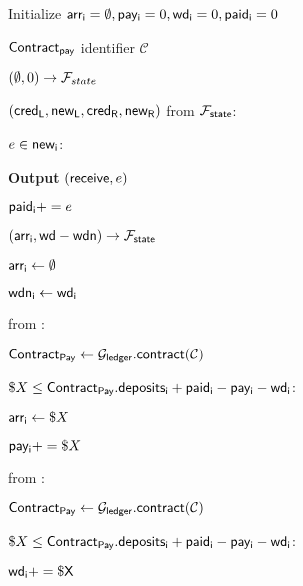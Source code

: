 \begin{bbox}[title=$\Pi_{pay}$]

Initialize ${\mathsf {arr_i}} = \emptyset, {\mathsf {pay_i}} = 0, {\mathsf {wd_i}} = 0, {\mathsf {paid_i}} = 0$

${\mathsf {Contract_{pay}}}$ identifier $\mathcal{C}$ 

\Send $(\emptyset, 0) \rightarrow \mathcal{F}_{state}$

\OnInput $({\mathsf {cred_L}}, {\mathsf {new_L}}, {\mathsf {cred_R}}, {\mathsf {new_R}})$ from $\mathcal{F}_{{\mathsf {state}}}$:

	\quad \For $e \in {\mathsf {new_i}}$:

		\qquad \textbf{Output} $({\mathsf {receive}}, e)$

		\qquad ${\mathsf {paid_i}} += e$
	
	\quad \Send $({\mathsf {arr_i}}, {\mathsf {wd}}-{\mathsf {wdn}}) \rightarrow \mathcal{F}_{{\mathsf {state}}}$

	\quad ${\mathsf {arr_i}} \leftarrow \emptyset$

	\quad ${\mathsf {wdn_i}} \leftarrow {\mathsf {wd_i}}$

\OnInput {} from \Env:

	\quad ${\mathsf {Contract_{Pay}}} \leftarrow \mathcal{G}_{{\mathsf {ledger}}}.{\mathsf {contract}}(\mathcal{C})$

	\quad \If $\$X \leq {\mathsf {Contract_{Pay}}}.{\mathsf {deposits_i}} + {\mathsf {paid_i}} - {\mathsf {pay_i}} - {\mathsf {wd_i}}$:

		\qquad ${\mathsf {arr_i}} \leftarrow \$X$

		\qquad ${\mathsf {pay_i}} += \$X$

\OnInput {} from \Env:

	\quad ${\mathsf {Contract_{Pay}}} \leftarrow \mathcal{G}_{{\mathsf {ledger}}}.{\mathsf {contract}}(\mathcal{C})$

	\quad \If $\$X \leq {\mathsf {Contract_{Pay}}}.{\mathsf {deposits_i}} + {\mathsf {paid_i}} - {\mathsf {pay_i}} - {\mathsf {wd_i}}$:

		\qquad $\sf{wd_i} += \$X$

\end{bbox}
